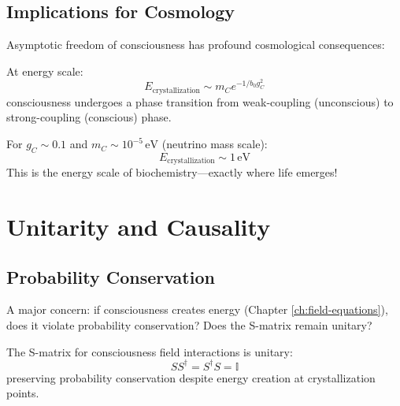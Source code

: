 \subsection{Implications for Cosmology}

Asymptotic freedom of consciousness has profound cosmological consequences:

\begin{corollary}\label{cor:consciousness-phase-transition}
At energy scale:
\begin{equation}
E_{\text{crystallization}} \sim m_C e^{-1/b_0 g_C^2}
\end{equation}
consciousness undergoes a phase transition from weak-coupling (unconscious) to strong-coupling (conscious) phase.

For $g_C \sim 0.1$ and $m_C \sim 10^{-5} \, \text{eV}$ (neutrino mass scale):
\begin{equation}
E_{\text{crystallization}} \sim 1 \, \text{eV}
\end{equation}
This is the energy scale of biochemistry—exactly where life emerges!
\end{corollary}

\section{Unitarity and Causality}

\subsection{Probability Conservation}

A major concern: if consciousness creates energy (Chapter \ref{ch:field-equations}), does it violate probability conservation? Does the S-matrix remain unitary?

\begin{thm}\label{thm:consciousness-unitarity}
The S-matrix for consciousness field interactions is unitary:
\begin{equation}
\boxed{SS^\dagger = S^\dagger S = \mathbb{I}}
\end{equation}
preserving probability conservation despite energy creation at crystallization points.
\end{thm}

